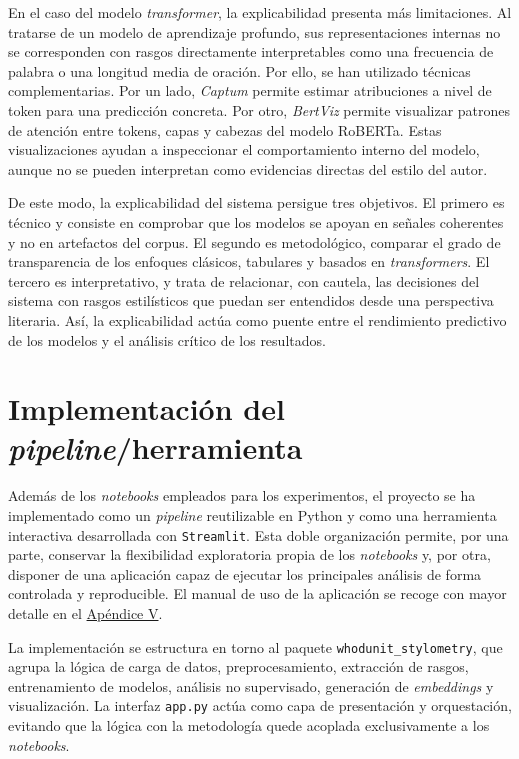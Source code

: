 \documentclass[IB]{TFUOC}%
\begin{document}
En el caso del modelo \textit{transformer}, la explicabilidad presenta más limitaciones. Al tratarse de un modelo de aprendizaje profundo, sus representaciones internas no se corresponden con rasgos directamente interpretables como una frecuencia de palabra o una longitud media de oración. Por ello, se han utilizado técnicas complementarias. Por un lado, \textit{Captum} permite estimar atribuciones a nivel de token para una predicción concreta. Por otro, \textit{BertViz} permite visualizar patrones de atención entre tokens, capas y cabezas del modelo RoBERTa. Estas visualizaciones ayudan a inspeccionar el comportamiento interno del modelo, aunque no se pueden interpretan como evidencias directas del estilo del autor.

De este modo, la explicabilidad del sistema persigue tres objetivos. El primero es técnico y consiste en comprobar que los modelos se apoyan en señales coherentes y no en artefactos del corpus. El segundo es metodológico, comparar el grado de transparencia de los enfoques clásicos, tabulares y basados en \textit{transformers}. El tercero es interpretativo, y trata de relacionar, con cautela, las decisiones del sistema con rasgos estilísticos que puedan ser entendidos desde una perspectiva literaria. Así, la explicabilidad actúa como puente entre el rendimiento predictivo de los modelos y el análisis crítico de los resultados.

\section{Implementación del \textit{pipeline}/herramienta}

Además de los \textit{notebooks} empleados para los experimentos, el proyecto se ha implementado como un \textit{pipeline} reutilizable en Python y como una herramienta interactiva desarrollada con \texttt{Streamlit}. Esta doble organización permite, por una parte, conservar la flexibilidad exploratoria propia de los \textit{notebooks} y, por otra, disponer de una aplicación capaz de ejecutar los principales análisis de forma controlada y reproducible. El manual de uso de la aplicación se recoge con mayor detalle en el \hyperref[apx:manual-usuario]{Apéndice V}.

La implementación se estructura en torno al paquete \texttt{whodunit\_stylometry}, que agrupa la lógica de carga de datos, preprocesamiento, extracción de rasgos, entrenamiento de modelos, análisis no supervisado, generación de \textit{embeddings} y visualización. La interfaz \texttt{app.py} actúa como capa de presentación y orquestación, evitando que la lógica con la metodología quede acoplada exclusivamente a los \textit{notebooks}.
\end{document}
